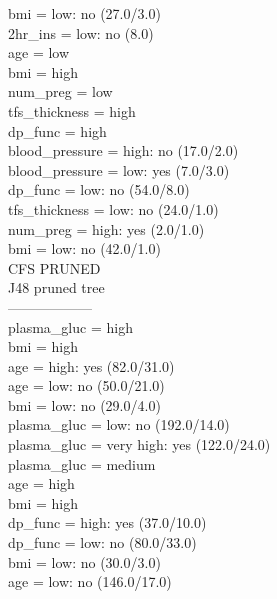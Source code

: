 \documentclass[12pt]{article}
\begin{document}
\textbar\quad   \textbar\quad   \textbar\quad   bmi = low: no (27.0/3.0)\\
\textbar\quad   \textbar\quad   2hr\_ins = low: no (8.0)\\
\textbar\quad   age = low\\
\textbar\quad   \textbar\quad   bmi = high\\
\textbar\quad   \textbar\quad   \textbar\quad   num\_preg = low\\
\textbar\quad   \textbar\quad   \textbar\quad   \textbar\quad   tfs\_thickness = high\\
\textbar\quad   \textbar\quad   \textbar\quad   \textbar\quad   \textbar\quad   dp\_func = high\\
\textbar\quad   \textbar\quad   \textbar\quad   \textbar\quad   \textbar\quad   \textbar\quad   blood\_pressure = high: no (17.0/2.0)\\
\textbar\quad   \textbar\quad   \textbar\quad   \textbar\quad   \textbar\quad   \textbar\quad   blood\_pressure = low: yes (7.0/3.0)\\
\textbar\quad   \textbar\quad   \textbar\quad   \textbar\quad   \textbar\quad   dp\_func = low: no (54.0/8.0)\\
\textbar\quad   \textbar\quad   \textbar\quad   \textbar\quad   tfs\_thickness = low: no (24.0/1.0)\\
\textbar\quad   \textbar\quad   \textbar\quad   num\_preg = high: yes (2.0/1.0)\\
\textbar\quad   \textbar\quad   bmi = low: no (42.0/1.0)\\


CFS PRUNED \\
J48 pruned tree \\
------------------ \\
plasma\_gluc = high \\
\textbar\quad   bmi = high \\
\textbar\quad   \textbar\quad   age = high: yes (82.0/31.0) \\
\textbar\quad   \textbar\quad   age = low: no (50.0/21.0) \\
\textbar\quad   bmi = low: no (29.0/4.0)\\
plasma\_gluc = low: no (192.0/14.0)\\
plasma\_gluc = very high: yes (122.0/24.0)\\
plasma\_gluc = medium\\
\textbar\quad   age = high\\
\textbar\quad   \textbar\quad   bmi = high\\
\textbar\quad   \textbar\quad   \textbar\quad   dp\_func = high: yes (37.0/10.0)\\
\textbar\quad   \textbar\quad   \textbar\quad   dp\_func = low: no (80.0/33.0)\\
\textbar\quad   \textbar\quad   bmi = low: no (30.0/3.0)\\
\textbar\quad   age = low: no (146.0/17.0)\\
\end{document}
